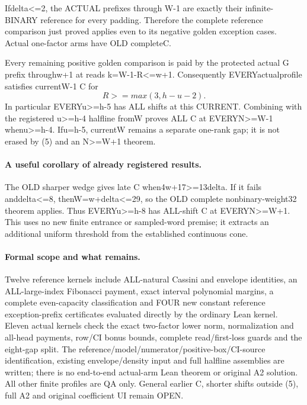 Ifdelta<=2, the ACTUAL prefixes through W-1 are exactly their
infinite-BINARY reference for every padding. Therefore the complete
reference comparison just proved applies even to its negative golden
exception cases. Actual one-factor arms have OLD completeC.

Every remaining positive golden comparison is paid by the protected
actual G prefix throughw+1 at reads k=W-1-R<=w+1. Consequently
EVERYactualprofile satisfies currentW-1 C for
\[
 R>=max(3,h-u-2).                                    \tag{5}
\]
In particular EVERYu>=h-5 has ALL shifts at this CURRENT.
Combining with the registered u>=h-4 halfline fromW proves ALL C
at EVERYN>=W-1 whenu>=h-4. Ifu=h-5, currentW remains a separate
one-rank gap; it is not erased by (5) and an N>=W+1 theorem.

\paragraph{A useful corollary of already registered results.}
The OLD sharper wedge gives late C when4w+17>=13delta. If it fails
anddelta<=8, thenW=w+delta<=29, so the OLD complete nonbinary-weight32
theorem applies. Thus EVERYu>=h-8 has ALL-shift C at EVERYN>=W+1.
This uses no new finite entrance or sampled-word premise; it extracts
an additional uniform threshold from the established continuous cone.

\paragraph{Formal scope and what remains.}
Twelve reference kernels include ALL-natural Cassini and envelope
identities, an ALL-large-index Fibonacci payment, exact interval
polynomial margins, a complete even-capacity classification and FOUR
new constant reference exception-prefix certificates evaluated directly
by the ordinary Lean kernel. Eleven actual kernels check the exact
two-factor lower norm, normalization and all-head payments, row/CI
bonus bounds, complete read/first-loss guards and the eight-gap split.
The reference/model/numerator/positive-box/CI-source identification,
existing envelope/density input and full halfline assemblies are written;
there is no end-to-end actual-arm Lean theorem or original A2 solution.
All other finite profiles are QA only. General earlier C, shorter shifts
outside (5), full A2 and original coefficient UI remain OPEN.
